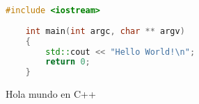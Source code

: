 

\begin{code}[H]
    \begin{lstlisting}[language=C++]
    #include <iostream>
    
    int main(int argc, char ** argv)
    {
        std::cout << "Hello World!\n";
        return 0;
    }
    \end{lstlisting}
    \caption[Hola mundo en C++]{Hola mundo en C++}
    \label{cod:holamundo_cplusplus}
\end{code}